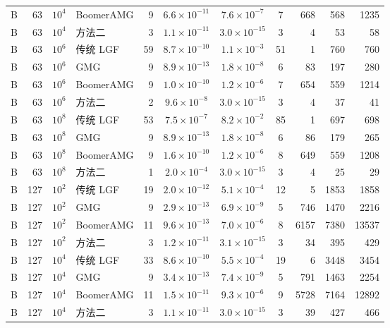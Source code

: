 \begin{longtable}{lrrlrcccrrr}
B & 63 & $10^{4}$ & BoomerAMG & 9 & $6.6{\times}10^{-11}$ & $7.6{\times}10^{-7}$ & 7 & 668 & 568 & 1235 \\
B & 63 & $10^{4}$ & 方法二 & 3 & $1.1{\times}10^{-11}$ & $3.0{\times}10^{-15}$ & 3 & 4 & 53 & 58 \\
B & 63 & $10^{6}$ & 传统 LGF & 59 & $8.7{\times}10^{-10}$ & $1.1{\times}10^{-3}$ & 51 & 1 & 760 & 760 \\
B & 63 & $10^{6}$ & GMG & 9 & $8.9{\times}10^{-13}$ & $1.8{\times}10^{-8}$ & 6 & 83 & 197 & 280 \\
B & 63 & $10^{6}$ & BoomerAMG & 9 & $1.0{\times}10^{-10}$ & $1.2{\times}10^{-6}$ & 7 & 654 & 559 & 1214 \\
B & 63 & $10^{6}$ & 方法二 & 2 & $9.6{\times}10^{-8}$ & $3.0{\times}10^{-15}$ & 3 & 4 & 37 & 41 \\
B & 63 & $10^{8}$ & 传统 LGF & 53 & $7.5{\times}10^{-7}$ & $8.2{\times}10^{-2}$ & 85 & 1 & 697 & 698 \\
B & 63 & $10^{8}$ & GMG & 9 & $8.9{\times}10^{-13}$ & $1.8{\times}10^{-8}$ & 6 & 86 & 179 & 265 \\
B & 63 & $10^{8}$ & BoomerAMG & 9 & $1.6{\times}10^{-10}$ & $1.2{\times}10^{-6}$ & 8 & 649 & 559 & 1208 \\
B & 63 & $10^{8}$ & 方法二 & 1 & $2.0{\times}10^{-4}$ & $3.0{\times}10^{-15}$ & 3 & 4 & 25 & 29 \\
B & 127 & $10^{2}$ & 传统 LGF & 19 & $2.0{\times}10^{-12}$ & $5.1{\times}10^{-4}$ & 12 & 5 & 1853 & 1858 \\
B & 127 & $10^{2}$ & GMG & 9 & $2.9{\times}10^{-13}$ & $6.9{\times}10^{-9}$ & 5 & 746 & 1470 & 2216 \\
B & 127 & $10^{2}$ & BoomerAMG & 11 & $9.6{\times}10^{-13}$ & $7.0{\times}10^{-6}$ & 8 & 6157 & 7380 & 13537 \\
B & 127 & $10^{2}$ & 方法二 & 3 & $1.2{\times}10^{-11}$ & $3.1{\times}10^{-15}$ & 3 & 34 & 395 & 429 \\
B & 127 & $10^{4}$ & 传统 LGF & 33 & $8.6{\times}10^{-10}$ & $5.5{\times}10^{-4}$ & 19 & 6 & 3448 & 3454 \\
B & 127 & $10^{4}$ & GMG & 9 & $3.4{\times}10^{-13}$ & $7.4{\times}10^{-9}$ & 5 & 791 & 1463 & 2254 \\
B & 127 & $10^{4}$ & BoomerAMG & 11 & $1.5{\times}10^{-11}$ & $9.3{\times}10^{-6}$ & 9 & 5728 & 7164 & 12892 \\
B & 127 & $10^{4}$ & 方法二 & 3 & $1.1{\times}10^{-11}$ & $3.0{\times}10^{-15}$ & 3 & 39 & 427 & 466 \\

\end{longtable}
